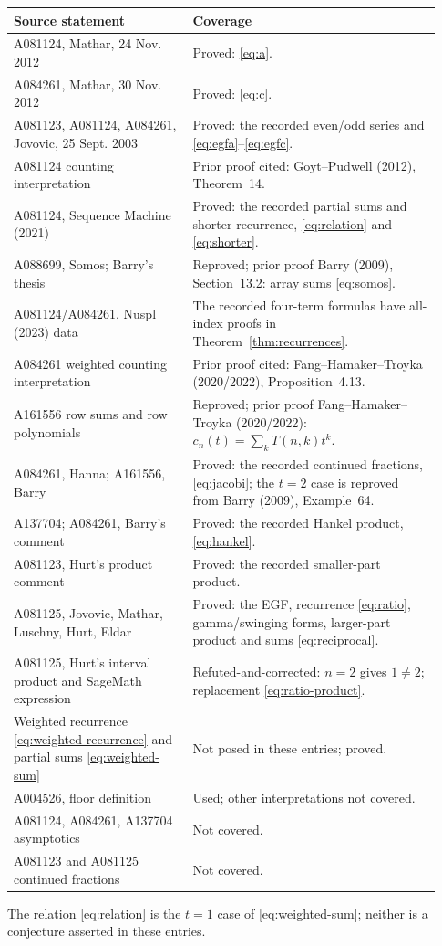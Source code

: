 \documentclass[11pt]{article}
\begin{document}
\begin{longtable}{@{}>{\raggedright\arraybackslash}p{0.39\linewidth}>{\raggedright\arraybackslash}p{0.54\linewidth}@{}}
\toprule
Source statement & Coverage\\
\midrule
\endhead
A081124, Mathar, 24 Nov. 2012 & Proved: \eqref{eq:a}.\\
A084261, Mathar, 30 Nov. 2012 & Proved: \eqref{eq:c}.\\
A081123, A081124, A084261, Jovovic, 25 Sept. 2003 & Proved: the recorded even/odd series and
\eqref{eq:egfa}--\eqref{eq:egfc}.\\
A081124 counting interpretation & Prior proof cited: Goyt--Pudwell (2012), Theorem~14.\\
A081124, Sequence Machine (2021) & Proved: the recorded partial sums and shorter recurrence, \eqref{eq:relation} and \eqref{eq:shorter}.\\
A088699, Somos; Barry's thesis & Reproved; prior proof Barry (2009), Section~13.2: array sums \eqref{eq:somos}.\\
A081124/A084261, Nuspl (2023) data & The recorded four-term formulas have all-index proofs in Theorem~\ref{thm:recurrences}.\\
A084261 weighted counting interpretation & Prior proof cited: Fang--Hamaker--Troyka (2020/2022), Proposition~4.13.\\
A161556 row sums and row polynomials & Reproved; prior proof Fang--Hamaker--Troyka (2020/2022): $c_n(t)=\sum_kT(n,k)t^k$.\\
A084261, Hanna; A161556, Barry & Proved: the recorded continued fractions, \eqref{eq:jacobi}; the $t=2$ case is reproved from Barry (2009), Example~64.\\
A137704; A084261, Barry's comment & Proved: the recorded Hankel product, \eqref{eq:hankel}.\\
A081123, Hurt's product comment & Proved: the recorded smaller-part product.\\
A081125, Jovovic, Mathar, Luschny, Hurt, Eldar & Proved: the EGF, recurrence \eqref{eq:ratio}, gamma/swinging forms, larger-part product and sums \eqref{eq:reciprocal}.\\
A081125, Hurt's interval product and SageMath expression & Refuted-and-corrected: $n=2$ gives $1\ne2$; replacement \eqref{eq:ratio-product}.\\
Weighted recurrence \eqref{eq:weighted-recurrence} and partial sums \eqref{eq:weighted-sum} & Not posed in these entries; proved.\\
A004526, floor definition & Used; other interpretations not covered.\\
A081124, A084261, A137704 asymptotics & Not covered.\\
A081123 and A081125 continued fractions & Not covered.\\
\bottomrule
\end{longtable}
\normalsize
The relation \eqref{eq:relation} is the $t=1$ case of
\eqref{eq:weighted-sum}; neither is a conjecture asserted in these entries.
\end{document}
